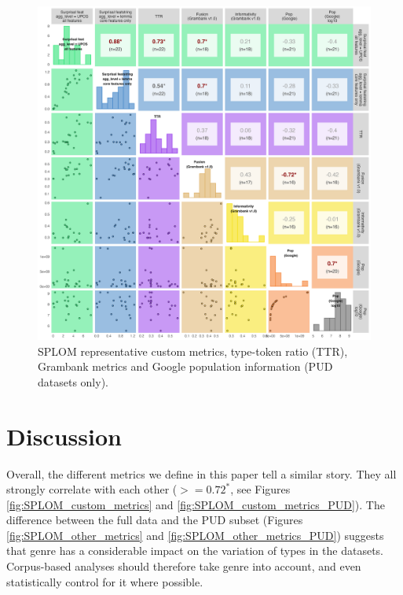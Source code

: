 \documentclass[USenglish]{article}
\begin{document}
\begin{figure}
    \centering
        \includegraphics[width=1\linewidth]{latex/graphics/SPLOM_metrics_external_PUD.png}
    \caption{SPLOM representative custom metrics, type-token ratio (TTR), Grambank metrics and Google population information  (PUD datasets only).}
    \label{fig:SPLOM_metrics_external_PUD}
\end{figure}

\FloatBarrier
\section{Discussion}
Overall, the different metrics we define in this paper tell a similar story. 
They all strongly correlate with each other ($>=0.72^*$, see Figures  \ref{fig:SPLOM_custom_metrics} and \ref{fig:SPLOM_custom_metrics_PUD}). 
The difference between the full data and the PUD subset (Figures  \ref{fig:SPLOM_other_metrics} and \ref{fig:SPLOM_other_metrics_PUD}) suggests that genre has a considerable impact on the variation of types in the datasets. 
Corpus-based analyses should therefore take genre into account, and even statistically control for it where possible.
\end{document}
